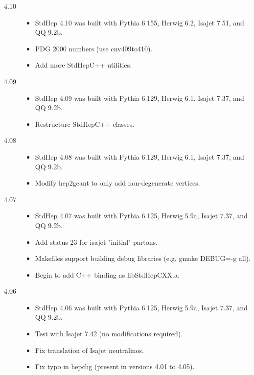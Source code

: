 \begin{description}
\item[4.10]

\begin{itemize}
\item StdHep 4.10 was built with Pythia 6.155, Herwig 6.2, Isajet 7.51, and QQ 9.2b.
\item PDG 2000 numbers  (use cnv409to410).
\item Add more StdHepC++ utilities.
\end{itemize}

\item[4.09]

\begin{itemize}
\item StdHep 4.09 was built with Pythia 6.129, Herwig 6.1, Isajet 7.37, and QQ 9.2b.
\item Restructure StdHepC++ classes.
\end{itemize}

\item[4.08]

\begin{itemize}
\item StdHep 4.08 was built with Pythia 6.129, Herwig 6.1, Isajet 7.37, and QQ 9.2b.
\item Modify hep2geant to only add non-degenerate vertices.
\end{itemize}

\item[4.07]

\begin{itemize}
\item StdHep 4.07 was built with Pythia 6.125, Herwig 5.9a, Isajet 7.37, and QQ 9.2b.
\item Add status 23 for isajet "initial" partons.
\item Makefiles support building debug libraries (e.g. gmake DEBUG=-g all).
\item Begin to add C++ binding as libStdHepCXX.a.
\end{itemize}

\item[4.06]

\begin{itemize}
\item StdHep 4.06 was built with Pythia 6.125, Herwig 5.9a, Isajet 7.37, and QQ 9.2b.
\item Test with Isajet 7.42 (no modifications required).
\item Fix translation of Isajet neutralinos.
\item Fix typo in hepchg (present in versions 4.01 to 4.05).
\end{itemize}


\end{description}
